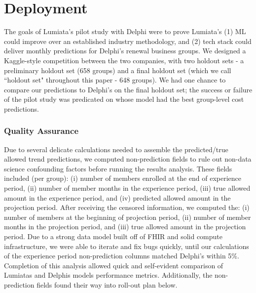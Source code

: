 \documentclass[letterpaper]{article} %
\begin{document}
\section*{Deployment}\label{sec:deployment}
The goals of Lumiata's pilot study with Delphi were to prove Lumiata's (1) ML could improve over an established industry methodology, and (2) tech stack could deliver monthly predictions for Delphi's renewal business groups. We designed a Kaggle-style competition between the two companies, with two holdout sets - a preliminary holdout set (658 groups) and a final holdout set (which we call ``holdout set" throughout this paper - 648 groups). We had one chance to compare our predictions to Delphi's on the final holdout set; the success or failure of the pilot study was predicated on whose model had the best group-level cost predictions.
\subsubsection{Quality Assurance}
Due to several delicate calculations needed to assemble the predicted/true allowed trend predictions, we computed non-prediction fields to rule out non-data science confounding factors before running the results analysis. These fields included (per group):
(i) number of members enrolled at the end of experience period,
(ii) number of member months in the experience period,
(iii) true allowed amount in the experience period, and
(iv) predicted allowed amount in the projection period.
After receiving the censored information, we computed the:
(i) number of members at the beginning of projection period,
(ii) number of member months in the projection period, and
(iii) true allowed amount in the projection period.
Due to a strong data model built off of FHIR and solid compute infrastructure, we were able to iterate and fix bugs quickly, until our calculations of the experience period non-prediction columns matched Delphi's within 5\%. Completion of this analysis allowed quick and self-evident comparison of Lumiatas and Delphis models performance metrics. Additionally, the non-prediction fields found their way into roll-out plan below.
\end{document}
